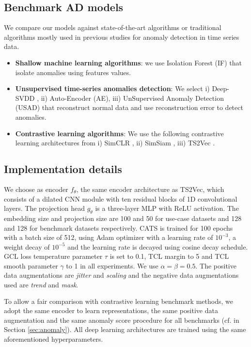 \subsection{Benchmark AD models}
We compare our models against state-of-the-art algorithms or traditional algorithms mostly used in previous studies for anomaly detection in time series data.
\begin{itemize}
    \item \textbf{Shallow machine learning algorithms}: we use Isolation Forest (IF) \cite{liu2008isolation} that isolate anomalies using features values.
    \item \textbf{Unsupervised time-series anomalies detection}: We select i) Deep-SVDD \cite{pmlr-v80-ruff18a}, ii) Auto-Encoder (AE), iii) UnSupervised Anomaly Detection (USAD) \cite{audibert2020usad} that reconstruct normal data and use reconstruction error to detect anomalies.
    \item \textbf{Contrastive learning algorithms}: We use the following contrastive learning architectures from i) SimCLR \cite{chen2020simple}, ii) SimSiam \cite{Chen2020ExploringSS}, iii) TS2Vec \cite{Yue2021TS2VecTU}.
\end{itemize}



\subsection{Implementation details}
We choose as encoder $f_\theta$, the same encoder architecture as TS2Vec, which consists of a dilated CNN module with ten residual blocks of 1D convolutional layers. The projection head $g_\theta$ is a three-layer MLP with ReLU activation. The embedding size and projection size are 100 and 50 for use-case datasets and 128 and 128 for benchmark datasets respectively. CATS is trained for 100 epochs with a batch size of 512, using Adam optimizer with a learning rate of $10^{-3}$, a weight decay of $10^{-5}$ and the learning rate is decayed using cosine decay schedule. GCL loss temperature parameter $\tau$ is set to 0.1, TCL margin to 5 and TCL smooth parameter $\gamma$ to 1 in all experiments. We use $\alpha = \beta = 0.5$. The positive data augmentations are \textit{jitter} and \textit{scaling} and the negative data augmentations used are \textit{trend} and \textit{mask}.

To allow a fair comparison with contrastive learning benchmark methods,  we adopt the same encoder to learn representations, the same positive data augmentation and the same anomaly score procedure for all benchmarks (cf. in Section \ref{sec:anomaly}). All deep learning architectures are trained using the same aforementioned hyperparameters.


